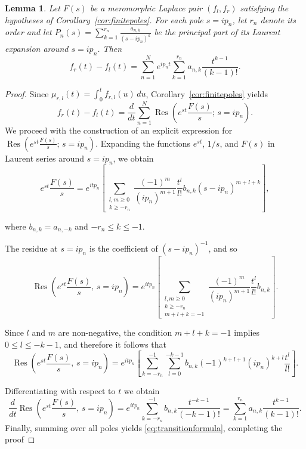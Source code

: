 \documentclass[10pt,a4paper]{amsart}
\newtheorem{lemma}{Lemma}
\DeclareMathOperator*{\Res}{Res}
\begin{document}
\begin{lemma}\label{lem:transitionforfinite}
Let $F(s)$ be a meromorphic Laplace pair $(f_l,f_r)$ satisfying the hypotheses of Corollary~\ref{cor:finitepoles}. 
For each pole $s=ip_n$, let $r_n$ denote its order and let
$\displaystyle{P_n(s)= \sum_{k=1}^{r_n}\frac{a_{n,k}}{(s-ip_n)^k}}$
be the principal part of its Laurent expansion around $s=ip_n$. Then
\begin{equation}\label{eq:transitionformula}
f_r(t)-f_l(t)= \sum_{n=1}^{N}e^{ip_nt}\sum_{k=1}^{r_n}a_{n,k}\frac{t^{k-1}}{(k-1)!}.
\end{equation}
\end{lemma}

\begin{proof}
Since $\mu_{r,l}(t)= \int_{0}^{t} f_{r,l}(u)\,du$, Corollary~\ref{cor:finitepoles} yields
\[
f_r(t)-f_l(t)
=
\frac{d}{dt}
\sum_{n=1}^{N}
\Res\!\left(e^{st}\frac{F(s)}{s};\, s=ip_n\right).
\] We proceed with the construction of an explicit expression for 
$\displaystyle{
\Res\!\left(e^{st}\frac{F(s)}{s};\, s=ip_n\right).}$ Expanding the functions $e^{st}$, $1/s$, and $F(s)$ in Laurent series around $s=ip_n$, we obtain
\begin{equation*}
    \label{eq_finite_transition}
e^{st}\frac{F(s)}{s}
=
e^{itp_n}
\left[
\sum_{\substack{l,m\ge 0 \\ k\ge -r_n}}
\frac{(-1)^m}{(ip_n)^{m+1}}
\frac{t^l}{l!}
b_{n,k}
(s-ip_n)^{m+l+k}
\right],
\end{equation*}


\noindent where $b_{n,k}=a_{n,-k}$ and $-r_n\le k\le -1.$ 

The residue at $s=ip_n$ is the coefficient of $(s-ip_n)^{-1}$, and so
\[
\Res\!\left(e^{st}\frac{F(s)}{s},\, s=ip_n\right)
=
e^{itp_n}
\left[
\sum_{\substack{l,m\ge 0 \\ k\ge -r_n \\ m+l+k=-1}}
\frac{(-1)^m}{(ip_n)^{m+1}}
\frac{t^l}{l!}
b_{n,k}
\right].
\]

\noindent Since $l$ and $m$ are non-negative, the condition $m+l+k=-1$ implies
$0\le l\le -k-1$, and therefore it follows that
\begin{equation}\label{eq:residuecomputation}
\Res\!\left(e^{st}\frac{F(s)}{s},\, s=ip_n\right)
=
e^{itp_n}
\left[
\sum_{k=-r_n}^{-1}
\sum_{l=0}^{-k-1}
b_{n,k}
(-1)^{k+l+1}
(ip_n)^{k+l}
\frac{t^l}{l!}
\right].
\end{equation}

\noindent Differentiating with respect to $t$ we obtain
\begin{equation}\label{eq:differentiationofresidues}
\frac{d}{dt}\Res\!\left(e^{st}\frac{F(s)}{s},\, s=ip_n\right)= e^{itp_n}\sum_{k=-r_n}^{-1}
b_{n,k}
\frac{t^{-k-1}}{(-k-1)!}
=
\sum_{k=1}^{r_n}
a_{n,k}
\frac{t^{k-1}}{(k-1)!}.
\end{equation}
Finally, summing over all poles yields \eqref{eq:transitionformula}, completing the proof
\end{proof}
\end{document}
